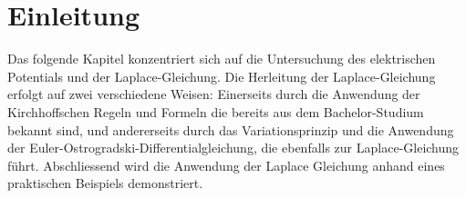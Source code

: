 %
%
%
%
\section{Einleitung\label{circuit:section:teil0}}
Das folgende Kapitel konzentriert sich auf die Untersuchung des elektrischen Potentials und der Laplace-Gleichung. Die Herleitung der Laplace-Gleichung erfolgt auf zwei verschiedene Weisen: Einerseits durch die Anwendung der Kirchhoffschen Regeln und Formeln die bereits aus dem Bachelor-Studium bekannt sind, und andererseits durch das Variationsprinzip und die Anwendung der Euler-Ostrogradski-Differentialgleichung, die ebenfalls zur Laplace-Gleichung führt. Abschliessend wird die Anwendung der Laplace Gleichung anhand eines praktischen Beispiels demonstriert.





